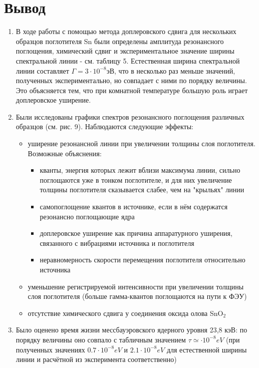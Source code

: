 \documentclass[a4paper]{article}
\begin{document}
\section{Вывод}
\begin{enumerate}
\item В ходе работы с помощью метода доплеровского сдвига для нескольких образцов поглотителя Sn были определены амплитуда резонансного поглощения, химический сдвиг и экспериментальное значение ширины спектральной линии - см. таблицу 5. Естественная ширина спектральной линии составляет $\Gamma = 3 \cdot 10^{-8} $эВ, что в несколько раз меньше значений, полученных экспериментально, но совпадает с ними по порядку величины. Это объясняется тем, что при комнатной температуре большую роль играет доплеровское уширение. 
\item Были исследованы графики спектров резонансного поглощения различных образцов (см. рис. 9). Наблюдаются следующие эффекты:
\begin{itemize}
    \item уширение резонансной линии при увеличении толщины слоя поглотителя. Возможные объяснения:
    \begin{itemize}
        \item кванты, энергия которых лежит вблизи максимума линии, сильно поглощаются уже в тонком поглотителе, и для них увеличение толщины поглотителя сказывается слабее, чем на "крыльях" линии
        \item самопоглощение квантов в источнике, если в нём содержатся резонансно поглощающие ядра
        \item доплеровское уширение как причина аппаратурного уширения, связанного с вибрациями источника и поглотителя
        \item неравномерность скорости перемещения поглотителя относительно источника
    \end{itemize}
    \item уменьшение регистрируемой интенсивности при увеличении толщины слоя поглотителя (больше гамма-квантов поглощаются на пути к ФЭУ)
    \item отсутствие химического сдвига у соединения оксида олова SnO$_2$
\end{itemize}
\item Было оценено время жизни мессбауэровского ядерного уровня 23,8 кэВ: по порядку величины оно совпало с табличным значением $\tau \simeq \cdot 10^{-8} eV$ (при полученных значениях $0.7 \cdot 10^{-8} eV$ и $2.1 \cdot 10^{-8} eV$ для естественной ширины линии и расчётной из эксперимента соответственно)
\end{enumerate}
\end{document}

